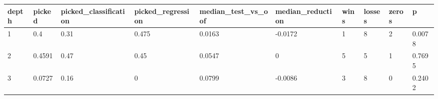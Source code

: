 \begin{tabular}{llllllllll}
\toprule
depth & picked & picked\_classification & picked\_regression & median\_test\_vs\_oof & median\_reduction & wins & losses & zeros & p \\
\midrule
1 & 0.4 & 0.31 & 0.475 & 0.0163 & -0.0172 & 1 & 8 & 2 & 0.0078 \\
2 & 0.4591 & 0.47 & 0.45 & 0.0547 & 0 & 5 & 5 & 1 & 0.7695 \\
3 & 0.0727 & 0.16 & 0 & 0.0799 & -0.0086 & 3 & 8 & 0 & 0.2402 \\
\bottomrule
\end{tabular}
